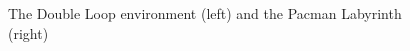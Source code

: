 \documentclass[letterpaper]{article}
\begin{document}
\begin{figure}[t]
\centering
{}
%
\hspace{1em}
\caption{The Double Loop environment (left) and the Pacman Labyrinth (right)\label{fig-overflow}\vspace*{-4mm}}
\end{figure}
\end{document}
